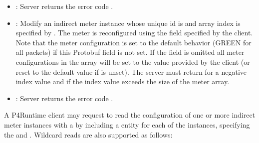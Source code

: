 \documentclass[11pt]{article}
\begin{document}
{\begin{itemize}[noitemsep,topsep=\mdcompacttopsep]
\item{}: Server returns the error code .%

\item{}: Modify an indirect meter instance whose unique id is  and
array index is specified by . The meter is reconfigured using the
 field specified by the client. Note that the meter configuration is
set to the default behavior (GREEN for all packets) if this Protobuf field is
not set. If the  field is omitted all meter configurations in the array
will be set to the value provided by the client (or reset to the default value
if  is unset). The server must return  for a
negative index value and  if the index value exceeds the size of
the meter array.%

\item{}: Server returns the error code .%
\end{itemize}%

\noindent{}A P4Runtime client may request to read the configuration of one or more indirect
meter instances with a  by including a  entity for each
of the instances, specifying the  and . Wildcard reads are also
supported as follows:%

}
\end{document}
